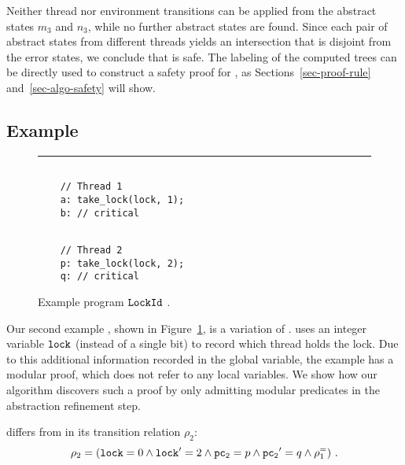 Neither thread nor environment transitions can be applied from the
abstract states $m_3$ and $n_3$, while no further abstract states are
found.
Since each pair of abstract states from different threads yields an
intersection that is disjoint from the error states, we conclude that
\TakeLockBit is safe.
The labeling of the computed trees can be directly used to construct a
safety proof for \TakeLockBit, as Sections~\ref{sec-proof-rule}
and~\ref{sec-algo-safety} will show.

\iffalse
We denote by $\artReachOf{1}$ and $\artReachOf{2}$ the set of all
abstract reachable states found in this last \aret computation.
\fi

\subsection{Example \TakeLockThreadId} \label{subsec-takethreadid}

\begin{figure}[t]
\small
\hrule
\begin{minipage}[t]{.48\columnwidth} 
\begin{verbatim} 

    // Thread 1 
    a: take_lock(lock, 1); 
    b: // critical 
\end{verbatim}
\end{minipage}
\hfill
\begin{minipage}[t]{.48\columnwidth} 
\begin{verbatim}

    // Thread 2
    p: take_lock(lock, 2);
    q: // critical

\end{verbatim}
\end{minipage}
  \caption{Example program $\texttt{LockId}\ $.}
  \label{fig-take-lock-2}
\end{figure}


Our second example \TakeLockThreadId, shown in
Figure~\ref{fig-take-lock-2}, is a variation of \TakeLockBit.
\TakeLockThreadId uses an integer variable $\mathtt{lock}$ (instead of a
single bit) to record which thread holds the lock.
Due to this additional information recorded in the global variable,
the example \TakeLockThreadId has a modular proof, which does not
refer to any local variables.
We show how our algorithm discovers such a proof by only admitting
modular predicates in the abstraction refinement step.

\TakeLockThreadId differs from \TakeLockBit in its transition relation
$\rho_2$:
%
\begin{equation*}
  \rho_2 = (\mathtt{lock}=0 \land \mathtt{lock}'=2 \land \mathtt{pc_2}=p \land \mathtt{pc_2}'=q
  \land \rho^=_{1})\ .
\end{equation*}

